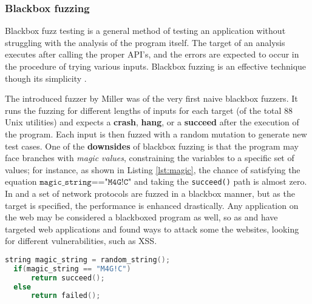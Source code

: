 \subsubsection{Blackbox fuzzing}

Blackbox fuzz testing is a general method of testing an application without struggling with the analysis of the program itself. The target of an analysis executes after calling the proper API's, and the errors are expected to occur in the procedure of trying various inputs. Blackbox fuzzing is an effective technique though its simplicity \cite{woo2013scheduling}.

The introduced fuzzer by Miller \cite{miller1990empirical} was of the very first naive blackbox fuzzers. It runs the fuzzing for different lengths of inputs for each target (of the total 88 Unix utilities) and expects a \textbf{crash}, \textbf{hang}, or a \textbf{succeed} after the execution of the program. Each input is then fuzzed with a random mutation to generate new test cases. One of the \textbf{downsides} of blackbox fuzzing is that the program may face branches with \textit{magic values}, constraining the variables to a specific set of values; for instance, as shown in Listing \ref{lst:magic}, the chance of satisfying the equation $\texttt{magic\_string=="M4G!C"}$ and taking the \texttt{succeed()} path is almost zero. In \cite{banks2006snooze} and \cite{gascon2015pulsar} a set of network protocols are fuzzed in a blackbox manner, but as the target is specified, the performance is enhanced drastically. Any application on the web may be considered a blackboxed program as well, so as \cite{doupe2012enemy} and \cite{duchene2012xss} have targeted web applications and found ways to attack some the websites, looking for different vulnerabilities, such as XSS.

\begin{lstlisting}[language=C++,style=CodeStyle,caption=Magic Value: \texttt{M4G!C} is a magic value,label={lst:magic}]
  string magic_string = random_string();
  if(magic_string == "M4G!C")
      return succeed();
  else
      return failed();
\end{lstlisting}

